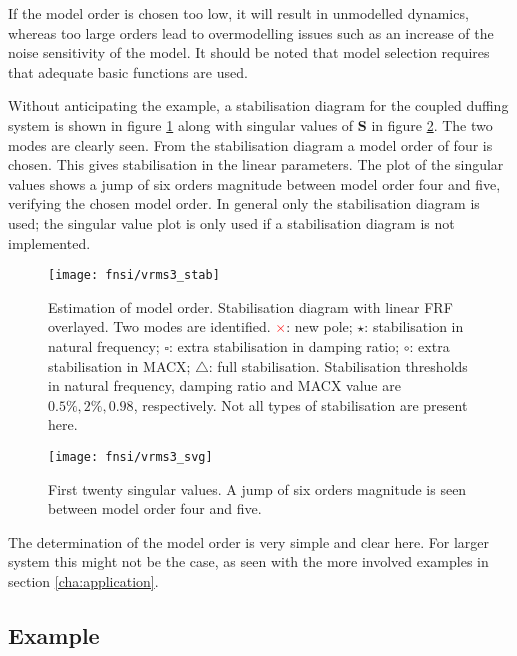 

If the model order is chosen too low, it will result in unmodelled dynamics,
whereas too large orders lead to overmodelling issues such as an increase of the
noise sensitivity of the model. It should be noted that model selection requires
that adequate basic functions are used.

Without anticipating the example, a stabilisation diagram for the coupled
duffing system is shown in figure \ref{fig:fnsi_stab} along with singular values
of $\bm S$ in figure \ref{fig:fnsi_svg}. The two modes are clearly seen.
From the stabilisation diagram a model order of four is chosen. This gives
stabilisation in the linear parameters. The plot of the singular values shows a
jump of six orders magnitude between model order four and five, verifying the
chosen model order.
In general only the stabilisation diagram is used; the singular value plot is
only used if a stabilisation diagram is not implemented.

\begin{figure}
  \centering
  \texttt{[image: fnsi/vrms3\_stab]}
  \caption{Estimation of model order. Stabilisation diagram with linear FRF
    overlayed. Two modes are identified.
    \textcolor{red}{$\pmb\times$}: new pole;
    $\pmb\star$: stabilisation in natural frequency;
    $\pmb\square$: extra stabilisation in damping ratio;
    $\pmb\circ$: extra stabilisation in MACX;
    $\pmb\triangle$: full stabilisation.
    Stabilisation thresholds in natural frequency, damping ratio and MACX value
    are $0.5\%, 2\%, 0.98$, respectively. Not all types of stabilisation are
    present here.
  }
  \label{fig:fnsi_stab}
\end{figure}

\begin{figure}
  \centering
  \texttt{[image: fnsi/vrms3\_svg]}
  \caption{First twenty singular values. A jump of six orders magnitude is seen
    between model order four and five.}
  \label{fig:fnsi_svg}
\end{figure}

The determination of the model order is very simple and clear here. For larger system this
might not be the case, as seen with the more involved examples in section
\ref{cha:application}.

\subsection{Example}
\label{sec:fnsi_example}

